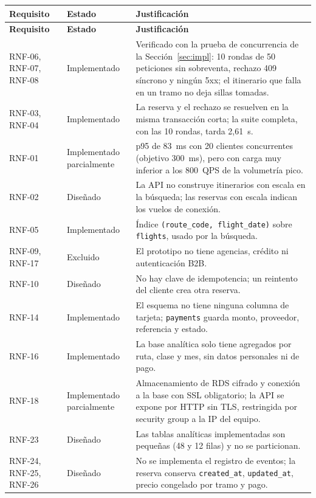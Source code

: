 \documentclass[10pt,letterpaper]{article}
\begin{document}
\begin{longtable}{@{}L{2.6cm} L{2.8cm} L{10.4cm}@{}}
\toprule \textbf{Requisito} & \textbf{Estado} & \textbf{Justificación} \\ \midrule \endfirsthead
\toprule \textbf{Requisito} & \textbf{Estado} & \textbf{Justificación} \\ \midrule \endhead
RNF-06, RNF-07, RNF-08 & Implementado & Verificado con la prueba de concurrencia de la Sección~\ref{sec:impl}: 10 rondas de 50 peticiones sin sobreventa, rechazo 409 síncrono y ningún 5xx; el itinerario que falla en un tramo no deja sillas tomadas. \\
RNF-03, RNF-04 & Implementado & La reserva y el rechazo se resuelven en la misma transacción corta; la suite completa, con las 10 rondas, tarda 2,61~s. \\
RNF-01 & Implementado parcialmente & p95 de 83~ms con 20 clientes concurrentes (objetivo 300~ms), pero con carga muy inferior a los 800~QPS de la volumetría pico. \\
RNF-02 & Diseñado & La API no construye itinerarios con escala en la búsqueda; las reservas con escala indican los vuelos de conexión. \\
RNF-05 & Implementado & Índice \texttt{(route\_code, flight\_date)} sobre \texttt{flights}, usado por la búsqueda. \\
RNF-09, RNF-17 & Excluido & El prototipo no tiene agencias, crédito ni autenticación B2B. \\
RNF-10 & Diseñado & No hay clave de idempotencia; un reintento del cliente crea otra reserva. \\
RNF-14 & Implementado & El esquema no tiene ninguna columna de tarjeta; \texttt{payments} guarda monto, proveedor, referencia y estado. \\
RNF-16 & Implementado & La base analítica solo tiene agregados por ruta, clase y mes, sin datos personales ni de pago. \\
RNF-18 & Implementado parcialmente & Almacenamiento de RDS cifrado y conexión a la base con SSL obligatorio; la API se expone por HTTP sin TLS, restringida por security group a la IP del equipo. \\
RNF-23 & Diseñado & Las tablas analíticas implementadas son pequeñas (48 y 12 filas) y no se particionan. \\
RNF-24, RNF-25, RNF-26 & Diseñado & No se implementa el registro de eventos; la reserva conserva \texttt{created\_at}, \texttt{updated\_at}, precio congelado por tramo y pago. \\

\end{longtable}
\end{document}

